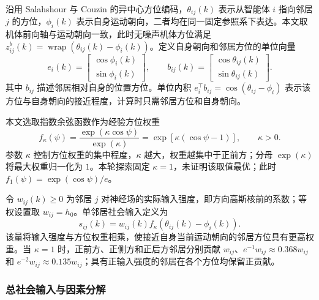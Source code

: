 \documentclass[UTF8,fontset=windows,11pt]{ctexart}
\newcommand{\upcite}[1]{\textsuperscript{\cite{#1}}}
\begin{document}
沿用 Salahshour 与 Couzin 的异中心方位编码\upcite{Salahshour2025}，$\theta_{ij}(k)$ 表示从智能体 $i$ 指向邻居 $j$ 的方位，$\phi_i(k)$ 表示自身运动朝向，二者均在同一固定参照系下表达。本文取机体前向轴与运动朝向一致，此时无噪声机体方位满足 $z^b_{ij}(k)=\operatorname{wrap}(\theta_{ij}(k)-\phi_i(k))$。定义自身朝向和邻居方位的单位向量
\begin{equation}
 e_i(k)=\begin{bmatrix}\cos\phi_i(k)\\\sin\phi_i(k)\end{bmatrix},
 \qquad
 b_{ij}(k)=\begin{bmatrix}\cos\theta_{ij}(k)\\\sin\theta_{ij}(k)\end{bmatrix}.
\end{equation}
其中 $b_{ij}$ 描述邻居相对自身的位置方位。单位内积 $e_i^\top b_{ij}=\cos(\theta_{ij}-\phi_i)$ 表示该方位与自身朝向的接近程度，计算时只需邻居方位和自身朝向。

本文选取指数余弦函数作为经验方位权重
\begin{equation}
 f_\kappa(\psi)
 =\frac{\exp(\kappa\cos\psi)}{\exp(\kappa)}
 =\exp\!\left[\kappa(\cos\psi-1)\right],\qquad\kappa>0.
 \label{eq:exponential_bearing_weight}
\end{equation}
参数 $\kappa$ 控制方位权重的集中程度，$\kappa$ 越大，权重越集中于正前方；分母 $\exp(\kappa)$ 将最大权重归一化为 $1$。本轮探索固定 $\kappa=1$，未证明该取值最优；此时 $f_1(\psi)=\exp(\cos\psi)/e$。

令 $w_{ij}(k)\geq0$ 为邻居 $j$ 对神经场的实际输入强度，即方向高斯核前的系数；等权设置取 $w_{ij}=h_0$。单邻居社会输入定义为
\begin{equation}
 \boxed{s_{ij}(k)=w_{ij}(k)f_\kappa\!\left(\theta_{ij}(k)-\phi_i(k)\right).}
 \label{eq:single_social_input}
\end{equation}
该量将输入强度与方位权重相乘，使接近自身当前运动朝向的邻居方位具有更高权重。当 $\kappa=1$ 时，正前方、正侧方和正后方邻居分别贡献 $w_{ij}$、$e^{-1}w_{ij}\approx0.368w_{ij}$ 和 $e^{-2}w_{ij}\approx0.135w_{ij}$；具有正输入强度的邻居在各个方位均保留正贡献。

\subsubsection{总社会输入与因素分解}
\end{document}

